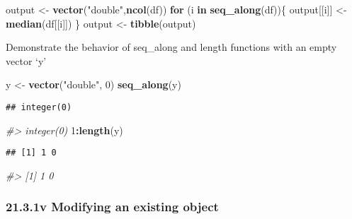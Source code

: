 \documentclass[
]{article}
\newenvironment{Shaded}{\begin{snugshade}}{\end{snugshade}}
\newcommand{\CommentTok}[1]{\textcolor[rgb]{0.56,0.35,0.01}{\textit{#1}}}
\newcommand{\ControlFlowTok}[1]{\textcolor[rgb]{0.13,0.29,0.53}{\textbf{#1}}}
\newcommand{\DecValTok}[1]{\textcolor[rgb]{0.00,0.00,0.81}{#1}}
\newcommand{\FunctionTok}[1]{\textcolor[rgb]{0.13,0.29,0.53}{\textbf{#1}}}
\newcommand{\NormalTok}[1]{#1}
\newcommand{\OtherTok}[1]{\textcolor[rgb]{0.56,0.35,0.01}{#1}}
\newcommand{\SpecialCharTok}[1]{\textcolor[rgb]{0.81,0.36,0.00}{\textbf{#1}}}
\newcommand{\StringTok}[1]{\textcolor[rgb]{0.31,0.60,0.02}{#1}}
\begin{document}
\begin{Shaded}
\begin{Highlighting}[]
\NormalTok{output }\OtherTok{\textless{}{-}} \FunctionTok{vector}\NormalTok{(}\StringTok{"double"}\NormalTok{,}\FunctionTok{ncol}\NormalTok{(df))}
\ControlFlowTok{for}\NormalTok{ (i }\ControlFlowTok{in} \FunctionTok{seq\_along}\NormalTok{(df))\{}
\NormalTok{  output[[i]] }\OtherTok{\textless{}{-}} \FunctionTok{median}\NormalTok{(df[[i]])}
\NormalTok{\}}
\NormalTok{output }\OtherTok{\textless{}{-}} \FunctionTok{tibble}\NormalTok{(output)}
\end{Highlighting}
\end{Shaded}

Demonstrate the behavior of seq\_along and length functions with an
empty vector `y'

\begin{Shaded}
\begin{Highlighting}[]
\NormalTok{y }\OtherTok{\textless{}{-}} \FunctionTok{vector}\NormalTok{(}\StringTok{"double"}\NormalTok{, }\DecValTok{0}\NormalTok{)}
\FunctionTok{seq\_along}\NormalTok{(y)}
\end{Highlighting}
\end{Shaded}

\begin{verbatim}
## integer(0)
\end{verbatim}

\begin{Shaded}
\begin{Highlighting}[]
\CommentTok{\#\textgreater{} integer(0)}
\DecValTok{1}\SpecialCharTok{:}\FunctionTok{length}\NormalTok{(y)}
\end{Highlighting}
\end{Shaded}

\begin{verbatim}
## [1] 1 0
\end{verbatim}

\begin{Shaded}
\begin{Highlighting}[]
\CommentTok{\#\textgreater{} [1] 1 0}
\end{Highlighting}
\end{Shaded}

\hypertarget{v-modifying-an-existing-object}{%
\subsubsection{21.3.1v Modifying an existing
object}\label{v-modifying-an-existing-object}}
\end{document}
